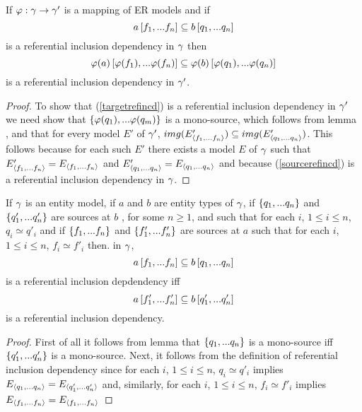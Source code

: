 \begin{lemma}
If $\varphi: \gamma \rightarrow \gamma'$ is a mapping of ER models and
if 
\begin{equation}
\label{sourcerefincd}
a\left[f_1,...f_n\right]\subseteq b\left[q_1,...q_n\right]
\end{equation}
is a referential inclusion dependency in $\gamma$ then  
\begin{equation}
\label{targetrefincd}
\varphi(a)\left[\varphi(f_1),...\varphi(f_n)\right]\subseteq\varphi(b)\left[\varphi(q_1),...\varphi(q_n)\right]
\end{equation}
is a referential inclusion dependency in $\gamma'$. 

\end{lemma}
\begin{proof}
To show that (\ref{targetrefincd}) is a referential inclusion dependency
 in $\gamma'$ we need show that $\left\{\varphi(q_1),...\varphi(q_m)\right\}$ is a mono-source, which follows from lemma , and that for every model $E'$ of $\gamma'$, 
$img(E'_{\langle f_1,...f_n\rangle}) \subseteq img(E'_{\langle q_1,...q_n\rangle})$. 
This follows because for each such $E'$ there exists a model $E$ of $\gamma$ such that 
$E'_{\langle f_1,...f_n\rangle}=E_{\langle f_1,...f_n\rangle}$ and $E'_{\langle q_1,...q_n\rangle}=E_{\langle q_1,...q_n\rangle}$ and because
(\ref{sourcerefincd}) is a referential inclusion dependency in $\gamma$.

\end{proof}

\begin{lemma}
If $\gamma$ is an entity model, 
if $a$ and $b$ are entity types of  $\gamma$,  if $\left\{q_1,...q_n\right\}$
and $\left\{q'_1,...q'_n\right\}$ are sources at $b$ , for some $n \geq 1$,
and such that for each $i$, $1 \leq i \leq n$, $q_i \simeq q'_i$  
and if $\left\{f_1,...f_n\right\}$ and $\left\{f'_1,...f'_n\right\}$ are sources at $a$
such that for each $i$, $1 \leq i \leq n$, $f_i \simeq f'_i$
then. in $\gamma$, 
\begin{equation}
\label{incdequivalence1}
a\left[f_1,...f_n\right]\subseteq b\left[q_1,...q_n\right]
\end{equation}
is a referential inclusion depdendency iff
\begin{equation}
\label{incdequivalence2}
a\left[f'_1,...f'_n\right]\subseteq b\left[q'_1,...q'_n\right]
\end{equation}
is a referential inclusion dependency.

\end{lemma}
\begin{proof}
First of all it follows from lemma  that $\left\{q_1,...q_n\right\}$ is a mono-source iff
$\left\{q'_1,...q'_n\right\}$ is a mono-source.
Next, it follows from the definition of referential inclusion dependency
 since for each $i$, $1 \leq i \leq n$, $q_i \simeq q'_i$  implies $E_{\langle q_1,...q_n\rangle} =
E_{\langle q'_1,...q'_n\rangle}$ and,
similarly, for each $i$, $1 \leq i \leq n$, $f_i \simeq f'_i$  implies $E_{\langle f_1,...f_n\rangle} =
E_{\langle f_1,...f_n\rangle}$
\end{proof}

